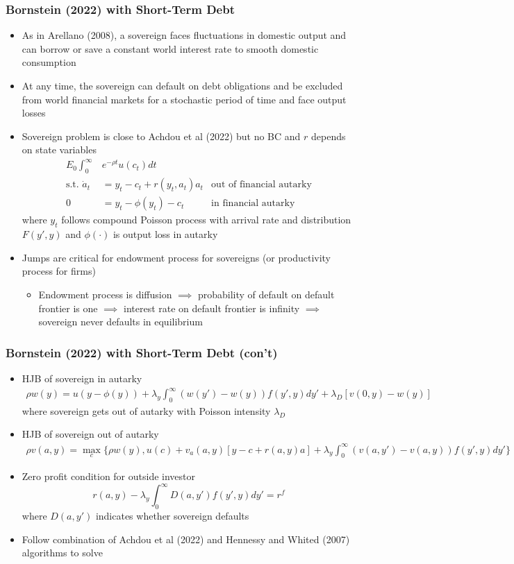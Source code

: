 \documentclass[usenames,dvipsnames, handout, aspectratio=169]{beamer}
\begin{document}
\begin{frame}[label = bornstein_summary_1]
\frametitle{Bornstein (2022) with Short-Term Debt}
\small
\begin{itemize}
\item  As in Arellano (2008), a sovereign faces fluctuations in domestic output and can borrow or save a constant world interest rate to smooth domestic consumption
\item At any time, the sovereign can default on debt obligations and be excluded from world financial markets for a stochastic period of time and face output losses
\item Sovereign problem is close to Achdou et al (2022) but no BC and $r$ depends on state variables
\begin{align*}
E_0 \int_0^\infty & e^{-\rho t} u(c_t) dt \\
\text{s.t. } 
\dot a_t &= y_t  - c_t + r(y_t, a_t) a_t & \text{out of financial autarky}\\
0 &= y_t  - \phi(y_t) - c_t & \text{in financial autarky}
\end{align*}
where $y_t$ follows compound Poisson process with arrival rate and distribution $F(y', y)$ and $\phi(\cdot)$ is output loss in autarky
\item  Jumps are critical for endowment process for sovereigns (or productivity process for firms)
\begin{itemize}
\item  Endowment process is diffusion $\implies$ probability of default on default frontier is one $\implies$ interest rate on default frontier is infinity $\implies$ sovereign never defaults in equilibrium
\end{itemize}
\end{itemize}
\end{frame}

\begin{frame}[label = bornstein_summary_2]
\frametitle{Bornstein (2022) with Short-Term Debt (con't) }
\small
\begin{itemize}
\item  HJB of sovereign in autarky
\begin{align*}
\rho w(y) = u(y-\phi(y)) + \lambda_y\int_0^\infty (w(y')-w(y)) f(y', y) dy' + \lambda_D [v(0,y) - w(y)]
\end{align*}
where sovereign gets out of autarky with Poisson intensity $\lambda_D$
\item HJB of sovereign out of autarky
\begin{align*}
\rho v(a, y) = \max_c \Bigg\{ \rho w(y), u(c) + v_a(a, y) [y - c + r(a, y)a] + \lambda_y\int_0^\infty (v(a,y')-v(a,y)) f(y', y) dy'\Bigg\}
\end{align*}
\item Zero profit condition for outside investor
$$
r(a, y) - \lambda_y \int_0^\infty D(a, y') f(y',y) dy' = r^f
$$
where $D(a, y')$ indicates whether sovereign defaults 
\item Follow combination of Achdou et al (2022) and Hennessy and Whited (2007) algorithms to solve
\end{itemize}
\end{frame}
\end{document}
